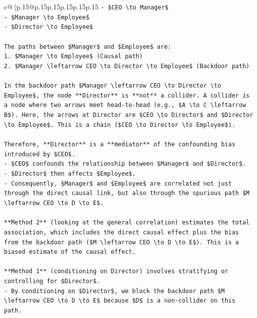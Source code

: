 \documentclass{article}
\begin{document}
{\begin{supertabular}{c@{$\;$}|p{.15\linewidth}@{}p{.15\linewidth}p{.15\linewidth}p{.15\linewidth}p{.15\linewidth}p{.15\linewidth}}
{{{\texttt{{-} \$CEO \textbackslash{}to Manager\$} \\
\texttt{{-} \$Manager \textbackslash{}to Employee\$} \\
\texttt{{-} \$Director \textbackslash{}to Employee\$} \\
\\ 
\texttt{The paths between \$Manager\$ and \$Employee\$ are:} \\
\texttt{1.  \$Manager \textbackslash{}to Employee\$ (Causal path)} \\
\texttt{2.  \$Manager \textbackslash{}leftarrow CEO \textbackslash{}to Director \textbackslash{}to Employee\$ (Backdoor path)} \\
\\ 
\texttt{In the backdoor path \$Manager \textbackslash{}leftarrow CEO \textbackslash{}to Director \textbackslash{}to Employee\$, the node **Director** is **not** a collider. A collider is a node where two arrows meet head{-}to{-}head (e.g., \$A \textbackslash{}to C \textbackslash{}leftarrow B\$). Here, the arrows at Director are \$CEO \textbackslash{}to Director\$ and \$Director \textbackslash{}to Employee\$. This is a chain (\$CEO \textbackslash{}to Director \textbackslash{}to Employee\$).} \\
\\ 
\texttt{Therefore, **Director** is a **mediator** of the confounding bias introduced by \$CEO\$.} \\
\texttt{{-} \$CEO\$ confounds the relationship between \$Manager\$ and \$Director\$.} \\
\texttt{{-} \$Director\$ then affects \$Employee\$.} \\
\texttt{{-} Consequently, \$Manager\$ and \$Employee\$ are correlated not just through the direct causal link, but also through the spurious path \$M \textbackslash{}leftarrow CEO \textbackslash{}to D \textbackslash{}to E\$.} \\
\\ 
\texttt{**Method 2** (looking at the general correlation) estimates the total association, which includes the direct causal effect plus the bias from the backdoor path (\$M \textbackslash{}leftarrow CEO \textbackslash{}to D \textbackslash{}to E\$). This is a biased estimate of the causal effect.} \\
\\ 
\texttt{**Method 1** (conditioning on Director) involves stratifying or controlling for \$Director\$.} \\
\texttt{{-} By conditioning on \$Director\$, we block the backdoor path \$M \textbackslash{}leftarrow CEO \textbackslash{}to D \textbackslash{}to E\$ because \$D\$ is a non{-}collider on this path.} \\
}}}
\end{supertabular}}
\end{document}
